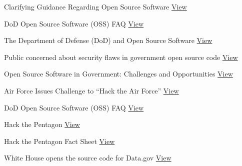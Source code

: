 \documentclass[a4paper]{article}
\begin{document}
Clarifying Guidance Regarding Open Source Software \href{http://dodcio.defense.gov/Portals/0/Documents/OSSFAQ/2009OSS.pdf}{View}

DoD Open Source Software (OSS) FAQ \href{http://dodcio.defense.gov/Open-Source-Software-FAQ/}{View}

The Department of Defense (DoD) and Open Source Software \href{http://www.oracle.com/us/products/middleware/cloud-app-foundation/weblogic/dod-and-open-source-software-2012277.pdf}{View}

Public concerned about security flaws in government open source code \href{https://www.csoonline.com/article/3047641/open-source-tools/public-concerned-about-security-flaws-in-government-open-source-code.html}{View}

Open Source Software in Government: Challenges and Opportunities \href{https://www.dhs.gov/sites/default/files/publications/Open%20Source%20Software%20in%20Government%20%E2%80%93%20Challenges%20and%20Opportunities_Final.pdf}{View}

Air Force Issues Challenge to “Hack the Air Force” \href{https://www.defense.gov/News/News-Releases/News-Release-View/Article/1164012/air-force-issues-challenge-to-hack-the-air-force/}{View}

DoD Open Source Software (OSS) FAQ \href{http://dodcio.defense.gov/Open-Source-Software-FAQ//#Frequently_Asked_Questions_regarding_Open_Source_Software_.28OSS.29_and_the_Department_of_Defense_.28DoD.29}{View}

Hack the Pentagon \href{https://www.hackerone.com/resources/hack-the-pentagon}{View}

Hack the Pentagon Fact Sheet \href{https://www.defense.gov/Portals/1/Documents/Fact_Sheet_Hack_the_Pentagon.pdf}{View}

White House opens the source code for Data.gov \href{https://gcn.com/articles/2011/12/08/datagov-goes-open-source-with-code.aspx}{View}
\end{document}
